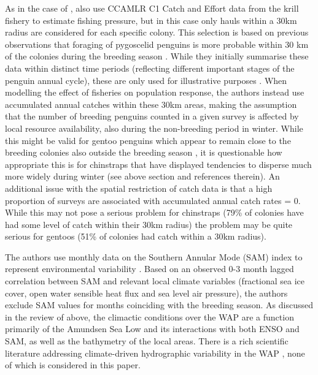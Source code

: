 \documentclass[]{elsarticle} %
\begin{document}
As in the case of \citet{Watters2020}, \citet{Kruger2021} also use
CCAMLR C1 Catch and Effort data from the krill fishery to estimate
fishing pressure, but in this case only hauls within a 30km radius are
considered for each specific colony. This selection is based on previous
observations that foraging of pygoscelid penguins is more probable
within 30 km of the colonies during the breeding season
\citep{Warwick-Evans2018}. While they initially summarise these data
within distinct time periods (reflecting different important stages of
the penguin annual cycle), these are only used for illustrative purposes
\citep[Fig 3 in][]{Kruger2021}. When modelling the effect of fisheries
on population response, the authors instead use accumulated annual
catches within these 30km areas, making the assumption that the number
of breeding penguins counted in a given survey is affected by local
resource availability, also during the non-breeding period in winter.
While this might be valid for gentoo penguins which appear to remain
close to the breeding colonies also outside the breeding season
\citep{korczak-abshireCoastalRegionsNorthern2021}, it is questionable
how appropriate this is for chinstraps that have displayed tendencies to
disperse much more widely during winter (see above section and
references therein). An additional issue with the spatial restriction of
catch data is that a high proportion of surveys are associated with
accumulated annual catch rates = 0. While this may not pose a serious
problem for chinstraps (79\% of colonies have had some level of catch
within their 30km radius) the problem may be quite serious for gentoos
(51\% of colonies had catch within a 30km radius).

The authors use monthly data on the Southern Annular Mode (SAM) index to
represent environmental variability
\citep{doddridgeModulationSeasonalCycle2017, kwokSpatialPatternsVariability2002}.
Based on an observed 0-3 month lagged correlation between SAM and
relevant local climate variables (fractional sea ice cover, open water
sensible heat flux and sea level air pressure), the authors exclude SAM
values for months coinciding with the breeding season. As discussed in
the review of \citet{Watters2020} above, the climactic conditions over
the WAP are a function primarily of the Amundsen Sea Low and its
interactions with both ENSO and SAM, as well as the bathymetry of the
local areas. There is a rich scientific literature addressing
climate-driven hydrographic variability in the WAP , none of which is
considered in this paper.
\end{document}
